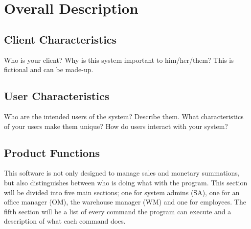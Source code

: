\documentclass{report}
\begin{document}
\section{Overall Description}
\label{sec:desc}
\subsection{Client Characteristics}
\label{sec:client}
Who is your client? Why is this system important to him/her/them? This is fictional and can be made-up.\par
\subsection{User Characteristics}
\label{sec:user}
Who are the intended users of the system? Describe them. What characteristics of your users make them unique?  How do users interact with your system?\par
\subsection{Product Functions}
\label{sec:functions}
This software is not only designed to manage sales and monetary summations, but also distinguishes between who is doing what with the program. This section will be divided into five main sections; one for system admins (SA), one for an office manager (OM), the warehouse manager (WM) and one for employees. The fifth section will be a list of every command the program can execute and a description of what each command does.\par
\end{document}
